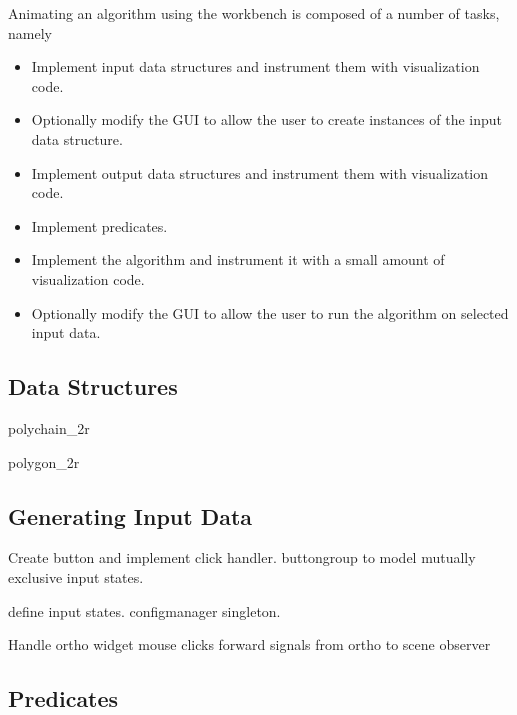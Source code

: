 Animating an algorithm using the workbench is composed of a number of tasks,
namely 
\begin{itemize}
  \item Implement input data structures and instrument them with visualization
  code.
  \item Optionally modify the GUI to allow the user to create instances of
  the input data structure.
  \item Implement output data structures and instrument them with visualization
  code.
  \item Implement predicates.
  \item Implement the algorithm and instrument it with a small amount of
  visualization code.
  \item Optionally modify the GUI to allow the user to run the algorithm on
  selected input data. 
\end{itemize}

\subsection{Data Structures}

polychain\_2r

polygon\_2r

\subsection{Generating Input Data}




Create button and implement click handler. buttongroup to model mutually
exclusive input states.

define input states. configmanager singleton. 



Handle ortho widget mouse clicks
forward signals from ortho to scene observer

\subsection{Predicates}

